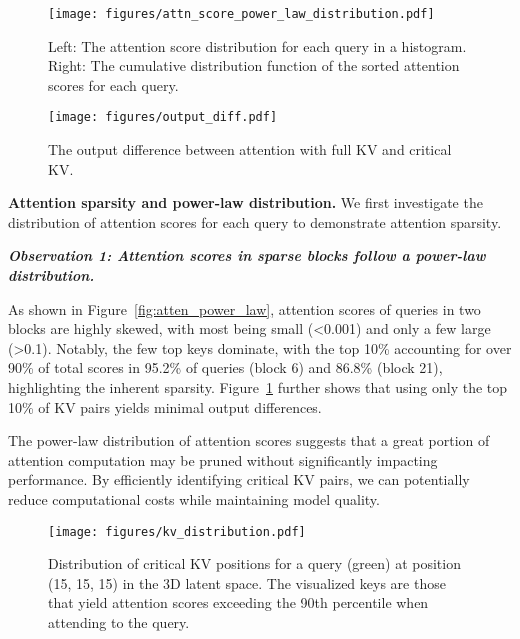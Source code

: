 \begin{figure}[t]
    \centering
    \begin{minipage}[t]{0.32\textwidth}
      \vspace{0pt} 
       \centering
   \texttt{[image: figures/attn\_score\_power\_law\_distribution.pdf]}
\caption{Left: The attention score distribution for each query in a histogram. Right: The cumulative distribution function of the sorted attention scores for each query. }
  \label{fig:atten_power_law} 
    \end{minipage}
    \hfill
    \hspace{-0.25in}
    \begin{minipage}[t]{0.15\textwidth}
      \vspace{0pt} 
      \centering
  \texttt{[image: figures/output\_diff.pdf]}
  \caption{The output difference between attention with full KV and critical KV.}
  \label{fig:output_diff} 
    \end{minipage}
   
\end{figure}


\noindent\textbf{Attention sparsity and power-law distribution.} 
We first investigate the distribution of attention scores for each query to demonstrate attention sparsity.



\hypertarget{obs1}{
\textbf{\textit{Observation 1: Attention scores in sparse blocks follow a power-law distribution.}}}

As shown in Figure~\ref{fig:atten_power_law}, attention scores of queries in two blocks are highly skewed, with most being small (<0.001) and only a few large (>0.1). Notably, the few top keys dominate, with the top 10\% accounting for over 90\% of total scores in 95.2\% of queries (block 6) and 86.8\% (block 21), highlighting the inherent sparsity. Figure~\ref{fig:output_diff} further shows that using only the top 10\% of KV pairs yields minimal output differences.

The power-law distribution of attention scores suggests that a great portion of attention computation may be pruned without significantly impacting performance. By efficiently identifying critical KV pairs, we can potentially reduce computational costs while maintaining model quality.

\begin{figure}[t]
  \centering
  \texttt{[image: figures/kv\_distribution.pdf]}
\caption{Distribution of critical KV positions for a query (green) at position (15, 15, 15) in the 3D latent space. The visualized keys are those that yield attention scores exceeding the 90th percentile when attending to the query.}
    \label{fig:kv_distribution}
\end{figure}

